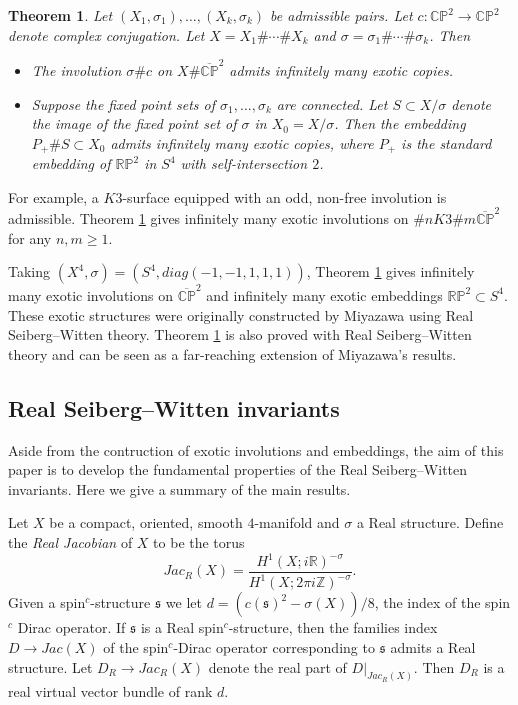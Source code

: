 \documentclass{amsart}
\newtheorem{theorem}{Theorem}[section]
\theoremstyle{definition}
\theoremstyle{remark}
\numberwithin{equation}{section}
\begin{document}
\begin{theorem}\label{thm:exotic0}
Let $(X_1, \sigma_1), \dots , (X_k , \sigma_k)$ be admissible pairs. Let $c : \mathbb{CP}^2 \to \mathbb{CP}^2$ denote complex conjugation. Let $X = X_1 \# \cdots \# X_k$ and $\sigma = \sigma_1 \# \cdots \# \sigma_k$. Then 
\begin{itemize}
\item[(1)]{The involution $\sigma \# c$ on $X \# \overline{\mathbb{CP}}^2$ admits infinitely many exotic copies.}
\item[(2)]{Suppose the fixed point sets of $\sigma_1, \dots , \sigma_k$ are connected. Let $S \subset X/\sigma$ denote the image of the fixed point set of $\sigma$ in $X_0 = X/\sigma$. Then the embedding $P_+ \# S \subset X_0$ admits infinitely many exotic copies, where $P_+$ is the standard embedding of $\mathbb{RP}^2$ in $S^4$ with self-intersection $2$.}
\end{itemize}
\end{theorem}

For example, a $K3$-surface equipped with an odd, non-free involution is admissible. Theorem \ref{thm:exotic0} gives infinitely many exotic involutions on $\# n K3 \# m \overline{\mathbb{CP}}^2$ for any $n,m \ge 1$.

Taking $(X^4 , \sigma) = (S^4 , diag(-1,-1,1,1,1))$, Theorem \ref{thm:exotic0} gives infinitely many exotic involutions on $\overline{\mathbb{CP}}^2$ and infinitely many exotic embeddings $\mathbb{RP}^2 \subset S^4$. These exotic structures were originally constructed by Miyazawa \cite{mi} using Real Seiberg--Witten theory. Theorem \ref{thm:exotic0} is also proved with Real Seiberg--Witten theory and can be seen as a far-reaching extension of Miyazawa's results.


\subsection{Real Seiberg--Witten invariants}

Aside from the contruction of exotic involutions and embeddings, the aim of this paper is to develop the fundamental properties of the Real Seiberg--Witten invariants. Here we give a summary of the main results.

Let $X$ be a compact, oriented, smooth $4$-manifold and $\sigma$ a Real structure. Define the {\em Real Jacobian} of $X$ to be the torus 
\[
Jac_R(X) = \frac{H^1(X ; i\mathbb{R})^{-\sigma}}{H^1(X ; 2\pi i \mathbb{Z})^{-\sigma}}.
\]
Given a spin$^c$-structure $\mathfrak{s}$ we let $d = (c(\mathfrak{s})^2 - \sigma(X))/8$, the index of the spin$^c$ Dirac operator. If $\mathfrak{s}$ is a Real spin$^c$-structure, then the families index $D \to Jac(X)$ of the spin$^c$-Dirac operator corresponding to $\mathfrak{s}$ admits a Real structure. Let $D_R \to Jac_R(X)$ denote the real part of $D|_{Jac_R(X)}$. Then $D_R$ is a real virtual vector bundle of rank $d$.
\end{document}
